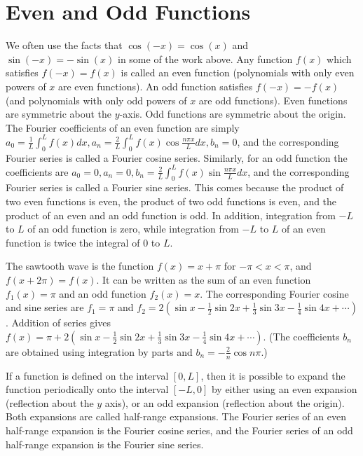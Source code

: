 \section{Even and Odd Functions}
We often use the facts that $\cos(-x)=\cos(x)$ and $\sin(-x)=-\sin(x)$ in some of the work above.  Any function $f(x)$ which satisfies $f(-x)=f(x)$ is called an even function (polynomials with only even powers of $x$ are even functions).  An odd function satisfies $f(-x)=-f(x)$ (and polynomials with only odd powers of $x$ are odd functions).  Even functions are symmetric about the $y$-axis. Odd functions are symmetric about the origin.  The Fourier coefficients of an even function are simply $a_0=\frac{1}{L}\int_0^L f(x)dx, a_n=\frac{2}{L}\int_0^L f(x)\cos \frac{n\pi x}{L}dx, b_n=0$, and the corresponding Fourier series is called a Fourier cosine series.  Similarly, for an odd function the coefficients are $a_0=0, a_n=0, b_n=\frac{2}{L}\int_0^L f(x)\sin \frac{n\pi x}{L}dx$, and the corresponding Fourier series is called a Fourier sine series. This comes because the product of two even functions is even, the product of two odd functions is even, and the product of an even and an odd function is odd. In addition, integration from $-L$ to $L$ of an odd function is zero, while integration from $-L$ to $L$ of an even function is twice the integral of $0$ to $L$.

The sawtooth wave is the function $f(x) = x+\pi$ for $-\pi<x<\pi$, and $f(x+2\pi)=f(x)$.  It can be written as the sum of an even function $f_1(x)=\pi$ and an odd function $f_2(x)=x$.  The corresponding Fourier cosine and sine series are $f_1=\pi$ and $f_2=2\left(\sin x -\frac{1}{2}\sin 2x +\frac{1}{3}\sin 3x -\frac{1}{4}\sin 4x+\cdots\right)$. Addition of series gives $f(x) = \pi+ 2\left(\sin x -\frac{1}{2}\sin 2x +\frac{1}{3}\sin 3x -\frac{1}{4}\sin 4x+\cdots\right)$. (The coefficients $b_n$ are obtained using integration by parts and $b_n = -\frac{2}{n}\cos n\pi$.)

If a function is defined on the interval $[0,L]$, then it is possible to expand the function periodically onto the interval $[-L,0]$ by either using an even expansion (reflection about the $y$ axis), or an odd expansion (reflection about the origin). Both expansions are called half-range expansions.  The Fourier series of an even half-range expansion is the Fourier cosine series, and the Fourier series of an odd half-range expansion is the Fourier sine series.  

